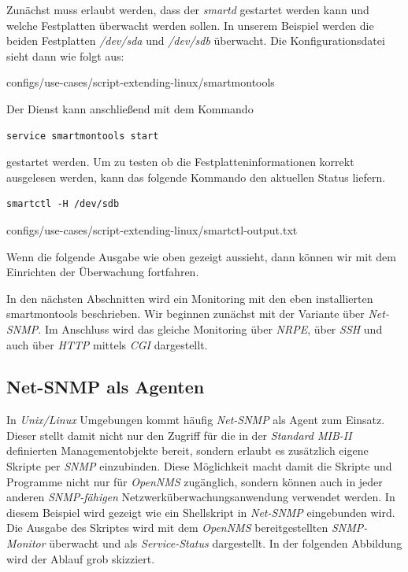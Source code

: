 Zunächst muss erlaubt werden, dass der \emph{smartd} gestartet werden kann und welche Festplatten überwacht werden sollen. In unserem Beispiel werden die beiden Festplatten \emph{/dev/sda} und \emph{/dev/sdb} überwacht. Die Konfigurationsdatei sieht dann wie folgt aus:


  {configs/use-cases/script-extending-linux/smartmontools}

Der Dienst kann anschließend mit dem Kommando

\begin{lstlisting}[numbers=none]
service smartmontools start
\end{lstlisting}

gestartet werden. Um zu testen ob die Festplatteninformationen korrekt ausgelesen werden, kann das folgende Kommando den aktuellen Status liefern.

\begin{lstlisting}[numbers=none]
smartctl -H /dev/sdb
\end{lstlisting}


  {configs/use-cases/script-extending-linux/smartctl-output.txt}

Wenn die folgende Ausgabe wie oben gezeigt aussieht, dann können wir mit dem Einrichten der Überwachung fortfahren.

In den nächsten Abschnitten wird ein Monitoring mit den eben installierten smartmontools beschrieben. Wir beginnen zunächst mit der Variante über \emph{Net-SNMP}. Im Anschluss wird das gleiche Monitoring über \emph{NRPE}, über \emph{SSH} und auch über \emph{HTTP} mittels \emph{CGI} dargestellt.

\subsection{Net-SNMP als Agenten}
In \emph{Unix/Linux} Umgebungen kommt häufig \emph{Net-SNMP} als Agent zum Einsatz. Dieser stellt damit nicht nur den Zugriff für die in der \emph{Standard MIB-II} definierten Managementobjekte bereit, sondern erlaubt es zusätzlich eigene Skripte per \emph{SNMP} einzubinden. Diese Möglichkeit macht damit die Skripte und Programme nicht nur für \emph{OpenNMS} zugänglich, sondern können auch in jeder anderen \emph{SNMP-fähigen} Netzwerküberwachungsanwendung verwendet werden. In diesem Beispiel wird gezeigt wie ein Shellskript in \emph{Net-SNMP} eingebunden wird. Die Ausgabe des Skriptes wird mit dem \emph{OpenNMS} bereitgestellten \emph{SNMP-Monitor} überwacht und als \emph{Service-Status} dargestellt. In der folgenden Abbildung wird der Ablauf grob skizziert.

